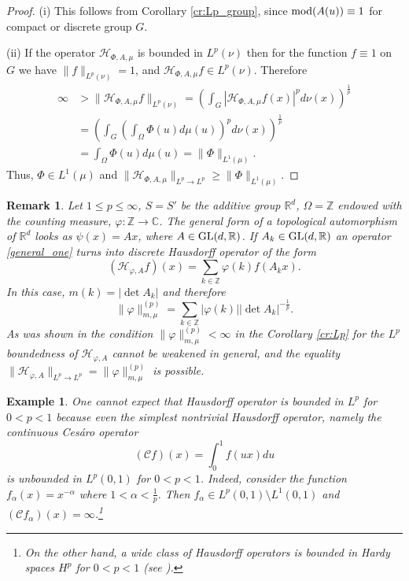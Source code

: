 \documentclass[12pt,reqno]{amsart}
\newtheorem{remark}{Remark}
\newtheorem{example}[theorem]{Example}
\begin{document}
 \begin{proof} 
 (i) This follows from Corollary \ref{cr:Lp_group}, since ${\rm mod}(A(u))\equiv 1$ for compact or discrete  group $G$.
 
 (ii) 
  If  the operator $\mathcal{H}_{\Phi, A,\mu}$
 is bounded in $L^p(\nu)$ then for the function $f\equiv 1$ on $G$ we have $\|f\|_{L^p(\nu)}=1$, and $\mathcal{H}_{\Phi, A,\mu}f\in L^p(\nu)$.  Therefore
 \begin{align*}
 \infty&>\|\mathcal{H}_{\Phi, A,\mu}f\|_{L^p(\nu)}=\left(\int_G |\mathcal{H}_{\Phi, A,\mu}f(x)|^pd\nu(x)\right)^{\frac1p}\\
 &=\left(\int_G \left(\int_\Omega \Phi(u)d\mu(u)\right)^pd\nu(x)\right)^{\frac1p}\\
 &= \int_\Omega \Phi(u)d\mu(u)=\|\Phi\|_{ L^1(\mu)}.
 \end{align*}
 Thus, $\Phi\in L^1(\mu)$   and $\|\mathcal{H}_{\Phi, A,\mu}\|_{L^p\to L^p}\ge\|\Phi\|_{ L^1(\mu)}$.
\end{proof}

\begin{remark}\label{discr} Let    $1\le p\le \infty$,  $S=S'$ be the additive group $\mathbb{R}^d$, $\Omega=\mathbb{Z}$ endowed with the counting measure, $\varphi:\mathbb{Z}\to \mathbb{C}$. The general form of a topological   automorphism of   $\mathbb{R}^d$  looks as $\psi(x)= Ax$, where $A\in {\rm GL}(d,\mathbb{R})$. If  $A_k\in {\rm GL}(d,\mathbb{R})$ an operator \eqref{general_one} turns into discrete Hausdorff operator of the form
$$
(\mathcal{H}_{\varphi, A}f)(x)=\sum_{k\in \mathbb{Z}}\varphi(k)f(A_kx).
$$
 In this case, $m(k)=|\det A_k|$  and therefore
$$
\|\varphi\|_{m,\mu}^{(p)}=\sum_{k\in \mathbb{Z}}|\varphi(k)||\det A_k|^{-\frac 1p}.
$$
As was shown in \cite[Lemma 2.2]{MMAS} the condition $\|\varphi\|_{m,\mu}^{(p)}<\infty$ in the Corollary \ref{cr:Lp} for the $L^p$ boundedness of $\mathcal{H}_{\varphi,A}$ cannot be weakened in general,
	and the equality $\|\mathcal{H}_{\varphi, A}\|_{L^p\to L^p}=\|\varphi\|_{m,\mu}^{(p)}$  is possible.
\end{remark}




\begin{example}
One cannot expect  that Hausdorff operator is bounded in $L^p$ for $0<p<1$ because even the simplest nontrivial Hausdorff operator, namely
 the continuous Ces\'{a}ro operator
$$
(\mathcal{C}f)(x)=\int_0^1f(ux)du
$$
is unbounded in $L^p(0,1)$ for $0<p<1$. Indeed, consider the function $f_\alpha(x)=x^{-\alpha}$ where $1<\alpha<\frac 1p$. Then $f_\alpha\in L^p(0,1)\setminus L^1(0,1)$ and $(\mathcal{C}f_\alpha)(x)=\infty$.\footnote{On the other hand, a wide class of  Hausdorff operators is bounded in Hardy spaces $H^p$ for $0<p<1$ (see \cite{LiMi1}).}
\end{example}
\end{document}
